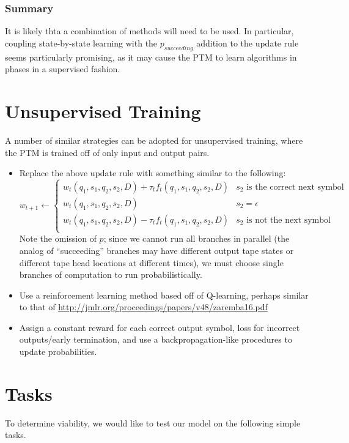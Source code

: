 \documentclass{article}
\begin{document}
\subsubsection{Summary}
It is likely thta a combination of methods will need to be used. In particular, coupling state-by-state learning with the $p_{succeeding}$ addition to the update rule seems particularly promising, as it may cause the PTM to learn algorithms in phases in a supervised fashion.

\section{Unsupervised Training}

A number of similar strategies can be adopted for unsupervised training, where the PTM is trained off of only input and output pairs. 

\begin{itemize}
    \item Replace the above update rule with something similar to the following:
\[ w_{t+1}\leftarrow 
\begin{cases}
    w_t(q_1, s_1, q_2, s_2, D) + \tau_tf_t(q_1, s_1, q_2, s_2, D) & \text{$s_2$ is the correct next symbol}\\
    w_t(q_1, s_1, q_2, s_2, D) & \text{$s_2 = \epsilon$}\\
    w_t(q_1, s_1, q_2, s_2, D) - \tau_tf_t(q_1, s_1, q_2, s_2, D) & \text{$s_2$ is not the next symbol}\\
\end{cases}
\]
    Note the omission of $p$; since we cannot run all branches in parallel (the analog of ``succeeding'' branches may have different output tape states or different tape head locations at different times), we must choose single branches of computation to run probabilistically. 
    \item Use a reinforcement learning method based off of Q-learning, perhaps similar to that of \url{http://jmlr.org/proceedings/papers/v48/zaremba16.pdf}
    \item Assign a constant reward for each correct output symbol,  loss for incorrect outputs/early termination, and use a backpropagation-like procedures to update probabilities.
\end{itemize}

\section{Tasks}
To determine viability, we would like to test our model on the following simple tasks.
\end{document}
